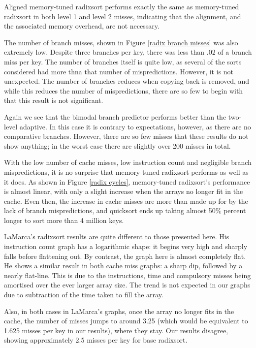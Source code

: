 Aligned memory-tuned radixsort performs exactly the same as memory-tuned
radixsort in both level 1 and level 2 misses, indicating that the alignment, and
the associated memory overhead, are not necessary.

The number of branch misses, shown in Figure \ref{radix branch misses} was also
extremely low. Despite three branches per key, there was less than .02 of a branch
miss per key. The number of branches itself is quite low, as several of the
sorts considered had more thna that number of mispredictions. However, it is not
unexpected. The number of branches reduces when copying back is removed, and
while this reduces the number of mispredictions, there are so few to begin with
that this result is not significant.

Again we see that the bimodal branch predictor performs better than the
two-level adaptive. In this case it is contrary to expectations, however, as
there are no comparative branches. However, there are so few misses that these
results do not show anything; in the worst case there are slightly over 200
misses in total.

With the low number of cache misses, low instruction count and negligible branch
mispredictions, it is no surprise that memory-tuned radixsort performs as well as it
does. As shown in Figure \ref{radix cycles}, memory-tuned radixsort's performance is
almost linear, with only a slight increase when the arrays no longer fit in the
cache.  Even then, the increase in cache misses are more than made up for by the
lack of branch mispredictions, and quicksort ends up taking almost 50\% percent
longer to sort more than 4 million keys.

LaMarca's radixsort results are quite different to those presented here. His
instruction count graph has a logarithmic shape: it begins very high and sharply
falls before flattening out. By contrast, the graph here is almost completely
flat. He shows a similar result in both cache miss graphs: a sharp dip, followed
by a nearly flat-line. This is due to the instructions, time and compulsory
misses being amortised over the ever larger array size. The trend is not
expected in our graphs due to subtraction of the time taken to fill the array.

Also, in both cases in LaMarca's graphs, once the array no longer fits in the
cache, the number of misses jumps to around 3.25 (which would be equivalent to
1.625 misses per key in our results), where they stay. Our results
disagree, showing approximately 2.5 misses per key for base radixsort.


